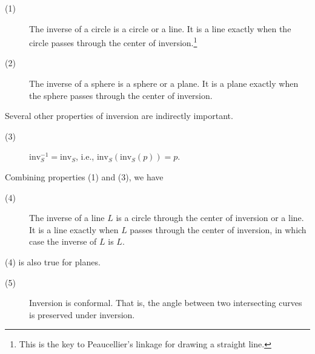 \begin{description}
\item[(1)]
\label{lem:inversion}
	The inverse of a circle is a circle or a line.
	It is a line exactly when the circle 
	passes through the center of inversion.\footnote{This is
	the key to Peaucellier's linkage for drawing a straight line.}
\item[(2)]
	The inverse of a sphere is a sphere or a plane.
	It is a plane exactly when the sphere 
	passes through the center of inversion.
\end{description}



Several other properties of inversion are indirectly important.

\begin{description}
\item[(3)]
	$\mbox{inv}_{S}^{-1} = \mbox{inv}_{S}$, 
	i.e., $\mbox{inv}_{S}(\mbox{inv}_{S}(p)) = p$.
\end{description}

Combining properties (1) and (3), we have

\begin{description}
\item[(4)]
	The inverse of a line $L$ is a circle through the center
	of inversion or a line.
	It is a line exactly when $L$
	passes through the center of inversion,
	in which case the inverse of $L$ is $L$.
\end{description}

(4) is also true for planes.

\begin{description}
\item[(5)]
\label{prop:conformal}
	Inversion is conformal.
	That is, the angle between two intersecting curves is 
	preserved under inversion.
\end{description}

